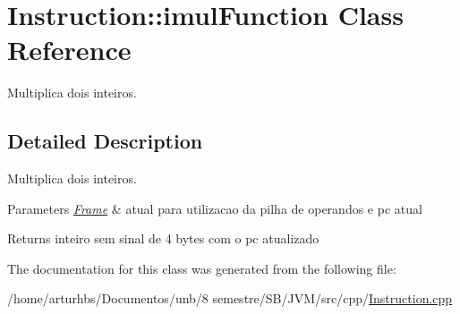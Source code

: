 \hypertarget{classInstruction_1_1imulFunction}{}\section{Instruction\+:\+:imul\+Function Class Reference}
\label{classInstruction_1_1imulFunction}


Multiplica dois inteiros.  




\subsection{Detailed Description}
Multiplica dois inteiros. 


\begin{DoxyParams}{Parameters}
{\em \hyperlink{classFrame}{Frame}} & atual para utilizacao da pilha de operandos e pc atual \\
\hline
\end{DoxyParams}
\begin{DoxyReturn}{Returns}
inteiro sem sinal de 4 bytes com o pc atualizado 
\end{DoxyReturn}


The documentation for this class was generated from the following file\+:\begin{DoxyCompactItemize}
\item 
/home/arturhbs/\+Documentos/unb/8 semestre/\+S\+B/\+J\+V\+M/src/cpp/\hyperlink{Instruction_8cpp}{Instruction.\+cpp}\end{DoxyCompactItemize}
